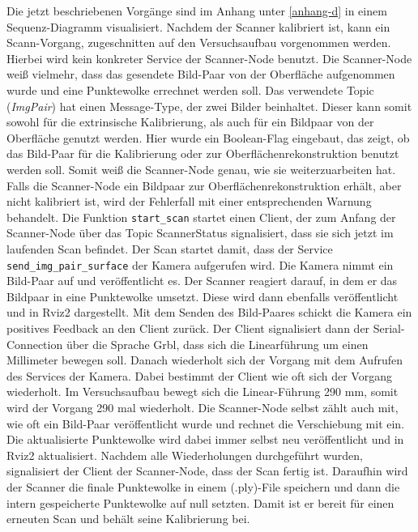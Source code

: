 		Die jetzt beschriebenen Vorgänge sind im Anhang unter \ref{anhang-d} in einem Sequenz-Diagramm visualisiert. \newline
		Nachdem der Scanner kalibriert ist, kann ein Scann-Vorgang, zugeschnitten auf den Versuchsaufbau vorgenommen werden. Hierbei wird kein konkreter Service der Scanner-Node benutzt. Die Scanner-Node weiß vielmehr, dass das gesendete Bild-Paar von der Oberfläche aufgenommen wurde und eine Punktewolke errechnet werden soll. Das verwendete Topic (\textit{ImgPair}) hat einen Message-Type, der zwei Bilder beinhaltet. Dieser kann somit sowohl für die extrinsische Kalibrierung, als auch für ein Bildpaar von der Oberfläche genutzt werden. Hier wurde ein Boolean-Flag eingebaut, das zeigt, ob das Bild-Paar für die Kalibrierung oder zur Oberflächenrekonstruktion benutzt werden soll. Somit weiß die Scanner-Node genau, wie sie weiterzuarbeiten hat. Falls die Scanner-Node ein Bildpaar zur Oberflächenrekonstruktion erhält, aber nicht kalibriert ist, wird der Fehlerfall mit einer entsprechenden Warnung behandelt. \newline
		Die Funktion \verb|start_scan| startet einen Client, der zum Anfang der Scanner-Node über das Topic ScannerStatus signalisiert, dass sie sich jetzt im laufenden Scan befindet. Der Scan startet damit, dass der Service \verb|send_img_pair_surface| der Kamera aufgerufen wird. Die Kamera nimmt ein Bild-Paar auf und veröffentlicht es. Der Scanner reagiert darauf, in dem er das Bildpaar in eine Punktewolke umsetzt. Diese wird dann ebenfalls veröffentlicht und in Rviz2 dargestellt. Mit dem Senden des Bild-Paares schickt die Kamera ein positives Feedback an den Client zurück. Der Client signalisiert dann der Serial-Connection über die Sprache Grbl, dass sich die Linearführung um einen Millimeter bewegen soll. Danach wiederholt sich der Vorgang mit dem Aufrufen des Services der Kamera. Dabei bestimmt der Client wie oft sich der Vorgang wiederholt. Im Versuchsaufbau bewegt sich die Linear-Führung 290 mm, somit wird der Vorgang 290 mal wiederholt. Die Scanner-Node selbst zählt auch mit, wie oft ein Bild-Paar veröffentlicht wurde und rechnet die Verschiebung mit ein. Die aktualisierte Punktewolke wird dabei immer selbst neu veröffentlicht und in Rviz2 aktualisiert. \newline
		Nachdem alle Wiederholungen durchgeführt wurden, signalisiert der Client der Scanner-Node, dass der Scan fertig ist. Daraufhin wird der Scanner die finale Punktewolke in einem (.ply)-File speichern und dann die intern gespeicherte Punktewolke auf null setzten. Damit ist er bereit für einen erneuten Scan und behält seine Kalibrierung bei.
		
